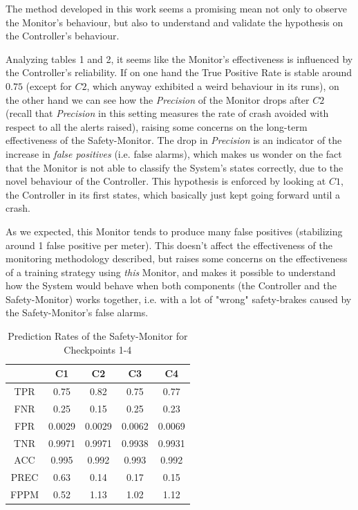 \vspace{0.5cm}

The method developed in this work seems a promising mean not only to observe the Monitor's behaviour, but also to understand and validate the hypothesis on the Controller's behaviour.\newline

Analyzing tables 1 and 2, it seems like the Monitor's effectiveness is influenced by the Controller's reliability. If on one hand the True Positive Rate is stable around $0.75$ (except for $C2$, which anyway exhibited a weird behaviour in its runs), on the other hand we can see how the \textsl{Precision} of the Monitor drops after $C2$ (recall that \textsl{Precision} in this setting measures the rate of crash avoided with respect to all the alerts raised), raising some concerns on the long-term effectiveness of the Safety-Monitor. The drop in \textsl{Precision} is an indicator of the increase in \textsl{false positives} (i.e. false alarms), which makes us wonder on the fact that the Monitor is not able to classify the System's states correctly, due to the novel behaviour of the Controller. This hypothesis is enforced by looking at $C1$, the Controller in its first states, which basically just kept going forward until a crash.

As we expected, this Monitor tends to produce many false positives (stabilizing around 1 false positive per meter). This doesn't affect the effectiveness of the monitoring methodology described, but raises some concerns on the effectiveness of a training strategy using \textsl{this} Monitor, and makes it possible to understand how the System would behave when both components (the Controller and the Safety-Monitor) works together, i.e. with a lot of "wrong" safety-brakes caused by the Safety-Monitor's false alarms.\newpage

\begin{table}[h!]
	\begin{center}
		\begin{tabular}{ |c|c|c|c|c| }
			\hline
			& C1 & C2 & C3 & C4 \\
			\hline
			TPR & 0.75 & 0.82 & 0.75 & 0.77 \\
			\hline
			FNR & 0.25 & 0.15 & 0.25 & 0.23 \\
			\hline
			FPR & 0.0029 & 0.0029 & 0.0062 & 0.0069 \\
			\hline
			TNR & 0.9971 & 0.9971 & 0.9938 & 0.9931 \\
			\hline
			ACC & 0.995 & 0.992 & 0.993 & 0.992 \\
			\hline
			PREC & 0.63 & 0.14 & 0.17 & 0.15 \\
			\hline
			FPPM & 0.52 & 1.13 & 1.02 & 1.12 \\
			\hline
		\end{tabular}
		
		\caption{Prediction Rates of the Safety-Monitor for Checkpoints 1-4}
	\end{center}
\end{table}

